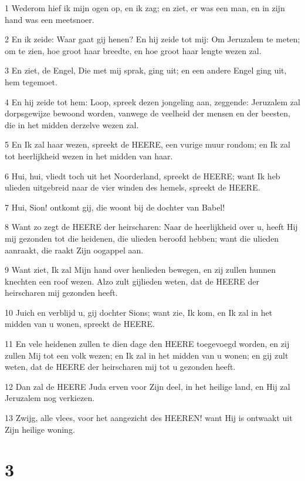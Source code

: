 \par 1 Wederom hief ik mijn ogen op, en ik zag; en ziet, er was een man, en in zijn hand was een meetsnoer.
\par 2 En ik zeide: Waar gaat gij henen? En hij zeide tot mij: Om Jeruzalem te meten; om te zien, hoe groot haar breedte, en hoe groot haar lengte wezen zal.
\par 3 En ziet, de Engel, Die met mij sprak, ging uit; en een andere Engel ging uit, hem tegemoet.
\par 4 En hij zeide tot hem: Loop, spreek dezen jongeling aan, zeggende: Jeruzalem zal dorpsgewijze bewoond worden, vanwege de veelheid der mensen en der beesten, die in het midden derzelve wezen zal.
\par 5 En Ik zal haar wezen, spreekt de HEERE, een vurige muur rondom; en Ik zal tot heerlijkheid wezen in het midden van haar.
\par 6 Hui, hui, vliedt toch uit het Noorderland, spreekt de HEERE; want Ik heb ulieden uitgebreid naar de vier winden des hemels, spreekt de HEERE.
\par 7 Hui, Sion! ontkomt gij, die woont bij de dochter van Babel!
\par 8 Want zo zegt de HEERE der heirscharen: Naar de heerlijkheid over u, heeft Hij mij gezonden tot die heidenen, die ulieden beroofd hebben; want die ulieden aanraakt, die raakt Zijn oogappel aan.
\par 9 Want ziet, Ik zal Mijn hand over henlieden bewegen, en zij zullen hunnen knechten een roof wezen. Alzo zult gijlieden weten, dat de HEERE der heirscharen mij gezonden heeft.
\par 10 Juich en verblijd u, gij dochter Sions; want zie, Ik kom, en Ik zal in het midden van u wonen, spreekt de HEERE.
\par 11 En vele heidenen zullen te dien dage den HEERE toegevoegd worden, en zij zullen Mij tot een volk wezen; en Ik zal in het midden van u wonen; en gij zult weten, dat de HEERE der heirscharen mij tot u gezonden heeft.
\par 12 Dan zal de HEERE Juda erven voor Zijn deel, in het heilige land, en Hij zal Jeruzalem nog verkiezen.
\par 13 Zwijg, alle vlees, voor het aangezicht des HEEREN! want Hij is ontwaakt uit Zijn heilige woning.

\chapter{3}

